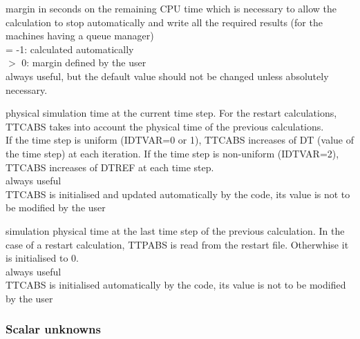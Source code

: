 {margin in seconds on the remaining CPU time which is necessary to allow
the calculation to stop automatically and write all the required results
(for the machines having a queue manager)\\
\hspace*{1.3cm}= -1: calculated automatically\\
\hspace*{1.3cm}$>$ 0: margin defined by the user\\
always useful, but the default value should not be changed
unless absolutely necessary.}


{physical simulation time at the current time step. For the restart
calculations, \mbox{TTCABS} takes into account the physical time of the
previous calculations.\\
If the time step is uniform (IDTVAR=0 or 1), TTCABS increases of DT (value of
the time step) at each iteration. If the time step is non-uniform (IDTVAR=2),
TTCABS increases of DTREF at each time step.\\
always useful\\
TTCABS is initialised and updated automatically by the code, its value is not to
be modified by the user}

{simulation physical time at the last time step of the previous
calculation. In the case of a restart calculation, TTPABS is read from
the restart file. Otherwhise it is initialised to 0.\\
always useful\\
TTCABS is initialised automatically by the code, its value is not to
be modified by the user}

\subsubsection{Scalar unknowns}


